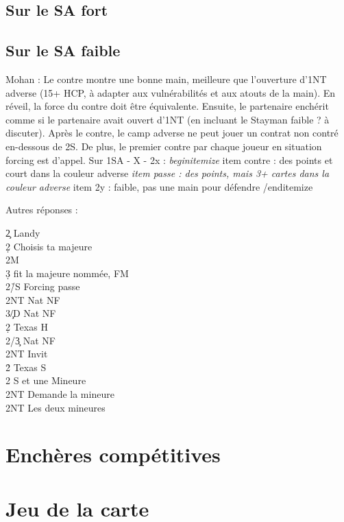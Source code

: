 \documentclass[a4paper]{article}
\begin{document}
\subsection{Sur le SA fort}

\subsection{Sur le SA faible}

Mohan : Le contre montre une bonne main, meilleure que l'ouverture d'1NT adverse (15+ HCP, à adapter aux vulnérabilités et aux atouts de la main). En réveil, la force du contre doit être équivalente.
Ensuite, le partenaire enchérit comme si le partenaire avait ouvert d'1NT (en incluant le Stayman faible ? à discuter).
Après le contre, le camp adverse ne peut jouer un contrat non contré en-dessous de 2S. De plus, le premier contre par chaque joueur en situation forcing est d'appel.
Sur 1SA - X - 2x : 
\emph{begin{itemize}
}item contre : des points et court dans la couleur adverse
\emph{item passe : des points, mais 3+ cartes dans la couleur adverse
}item 2y : faible, pas une main pour défendre
/end{itemize}

Autres réponses :

\begin{bidtable}
2\c \> Landy\+\\
2\d \> Choisis ta majeure\+\\
2M\+\\
3\d \> fit la majeure nommée, FM\-\-\\
2\h/S \> Forcing passe\\
2NT \> Nat NF\\
3\c/D \> Nat NF\-\\
2\d \> Texas H\+\\
2\s/3\c \> Nat NF\\
2NT \> Invit\-\\
2\h \> Texas S\\
2\s \> S et une Mineure\+\\
2NT \> Demande la mineure\-\\
2NT \> Les deux mineures
\end{bidtable}

\section{Enchères compétitives}

\section{Jeu de la carte}
\end{document}
